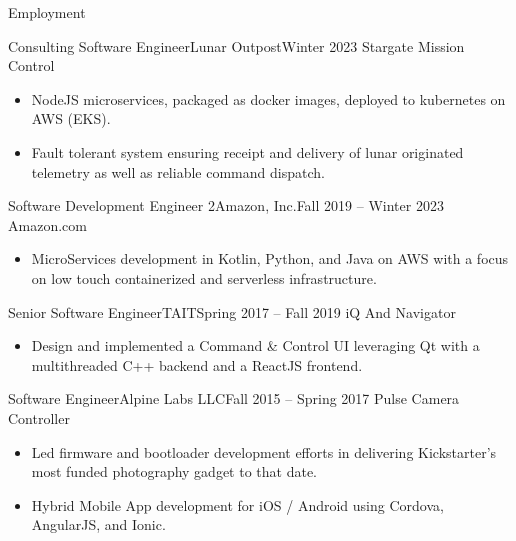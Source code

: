 \documentclass[]{mussocv}
\begin{document}
	\makeheader
	
	\begin{cvsection}{Employment}
		\begin{cvsubsection}{Consulting Software Engineer}{Lunar Outpost}{Winter 2023}
			Stargate Mission Control			
			\begin{itemize}
				\item NodeJS microservices, packaged as docker images, deployed to kubernetes on AWS (EKS). 
				\item Fault tolerant system ensuring receipt and delivery of lunar originated telemetry as well as reliable command dispatch. 
			\end{itemize}
		\end{cvsubsection}
		
		\begin{cvsubsection}{Software Development Engineer 2}{Amazon, Inc.}{Fall 2019 -- Winter 2023}
			Amazon.com
			\begin{itemize}
				\item MicroServices development in Kotlin, Python, and Java on AWS with a focus on low touch containerized and serverless infrastructure.
			\end{itemize}
		\end{cvsubsection}
		
		\begin{cvsubsection}{Senior Software Engineer}{TAIT}{Spring 2017 -- Fall 2019}
			iQ And Navigator 
			\begin{itemize}
				\item Design and implemented a Command \& Control UI leveraging Qt with a multithreaded C++ backend and a ReactJS frontend.
			\end{itemize}
		\end{cvsubsection}
		
		\begin{cvsubsection}{Software Engineer}{Alpine Labs LLC}{Fall 2015 -- Spring 2017}
			Pulse Camera Controller	
			\begin{itemize}
				\item Led firmware and bootloader development efforts in delivering Kickstarter's most funded photography gadget to that date.
				\item Hybrid Mobile App development for iOS / Android using Cordova, AngularJS, and Ionic.
			\end{itemize}
		\end{cvsubsection}


\end{cvsection}
\end{document}
